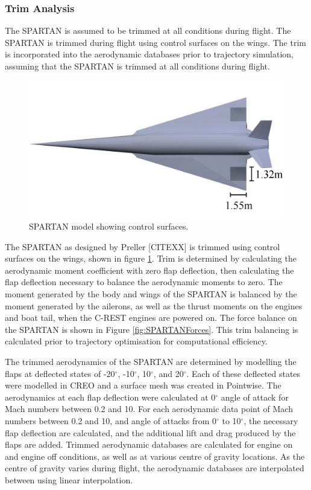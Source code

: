 		
		\subsubsection{Trim Analysis}\label{sec:trim}
		
		The SPARTAN is assumed to be
		trimmed at all conditions during flight. The SPARTAN is trimmed during flight using control surfaces on the wings. The trim is incorporated into the aerodynamic databases prior to trajectory simulation, assuming that the SPARTAN is trimmed at all conditions during flight. 		
		\begin{figure}[ht]
			\centering
			\includegraphics[width=0.6\linewidth]{figures/3_vehicle_design/SPARTAN_FLAPS}
			\caption{SPARTAN model showing control surfaces.}
			\label{fig:SPARTAN_FLAPS}
		\end{figure}
		The SPARTAN as designed by Preller [CITEXX] is trimmed using control surfaces on the wings, shown in figure \ref{fig:SPARTAN_FLAPS}. 
		Trim is determined by calculating the aerodynamic moment coefficient with zero flap deflection, then calculating the flap deflection necessary to balance the aerodynamic moments to zero. The moment generated by the body and wings of the SPARTAN is balanced by the moment generated by the ailerons, as well as the thrust moments on the engines and boat tail, when the C-REST engines are powered on. The force balance on the SPARTAN is shown in Figure \ref{fig:SPARTANForces}. This trim balancing is calculated prior to trajectory optimisation for computational efficiency.
		
		
		The trimmed aerodynamics of the SPARTAN are determined by modelling the flaps at deflected states of -20$^\circ$, -10$^\circ$, 10$^\circ$, and 20$^\circ$. Each of these deflected states were modelled in CREO and a surface mesh was created in Pointwise. The aerodynamics at each flap deflection were calculated at 0$^\circ$ angle of attack for Mach numbers between 0.2 and 10. For each aerodynamic data point of Mach numbers between 0.2 and 10, and angle of attacks from 0$^\circ$ to 10$^\circ$, the necessary flap deflection are calculated, and the additional lift and drag produced by the flaps are added.
		Trimmed aerodynamic databases are calculated for engine on and engine off conditions, as well as at various centre of gravity locations. As the centre of gravity varies during flight, the aerodynamic databases are interpolated between using linear interpolation. 

